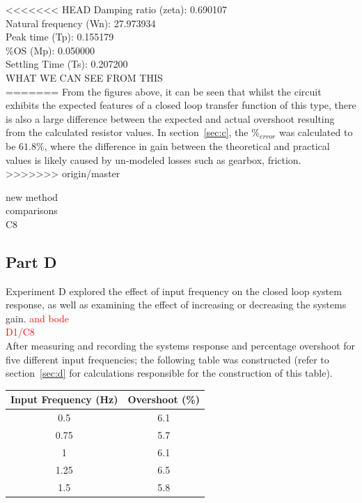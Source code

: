 \documentclass[11pt,a4paper]{article}
\begin{document}
<<<<<<< HEAD
Damping ratio (zeta): 0.690107\\
Natural frequency (Wn): 27.973934\\
Peak time (Tp): 0.155179\\
\%OS (Mp): 0.050000\\
Settling Time (Ts): 0.207200\\
WHAT WE CAN SEE FROM THIS\\
=======
From the figures above, it can be seen that whilst the circuit exhibits the expected features of a closed loop transfer function of this type, there is also a large difference between the expected and actual overshoot resulting from the calculated resistor values. In section~\ref{sec:c}, the $\%_{error}$ was calculated to be $61.8\%$, where the difference in gain between the theoretical and practical values is likely caused by un-modeled losses such as gearbox, friction.
>>>>>>> origin/master

new method\\
comparisons\\
C8\\








\pagebreak
\subsection{Part D}
Experiment D explored the effect of input frequency on the closed loop system response, as well as examining the effect of increasing or decreasing the systems gain. \textcolor{red}{and bode}\\
  
\textcolor{red}{D1/C8} \\

After measuring and recording the systems response and percentage overshoot for five different input frequencies; the following table was constructed (refer to section~\ref{sec:d} for calculations responsible for the construction of this table). 

\begin{center}
    \begin{tabular}{| c | c |}
    \hline
    Input Frequency (Hz)  & Overshoot (\%)  \\ \hline
    0.5  	                  & 6.1  		\\ \hline
	0.75  	                  & 5.7  		\\ \hline
	1		                  & 6.1 		\\ \hline
	1.25	                  & 6.5 		\\ \hline
	1.5		                  & 5.8 		\\
    \hline
    \end{tabular}
\end{center}
 
\end{document}
